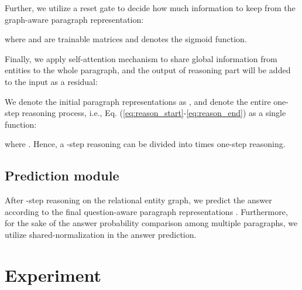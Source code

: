 \documentclass[11pt,a4paper]{article}
\begin{document}
Further, we utilize a reset gate to decide how much information to keep from the graph-aware paragraph representation:

where  and  are trainable matrices and  denotes the sigmoid function.


Finally, we apply self-attention mechanism to share global information from entities to the whole paragraph, and the output of reasoning part will be added to the input as a residual:


We denote the initial paragraph representations as , and denote the entire one-step reasoning process, i.e., Eq. (\ref{eq:reason_start}-\ref{eq:reason_end}) as a single function:

where . Hence, a -step reasoning can be divided into   times one-step reasoning.


\subsection{Prediction module}

After -step reasoning on the relational entity graph, we predict the answer according to the final question-aware paragraph representations . Furthermore, for the sake of the answer probability comparison among multiple paragraphs, we utilize shared-normalization \citep{clark2017simple} in the answer prediction. 











\section{Experiment}
\end{document}
